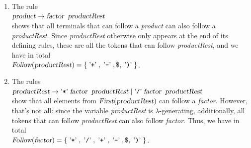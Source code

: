 \begin{enumerate}
      is \(\lambda\)-generating, additionally, all tokens that can follow \textsl{exprRest} can also follow \textsl{product}. Thus, we have in total
      \\[0.2cm]
      \hspace*{1.3cm}
      \(\textsl{Follow}(\textsl{product}) = 
      \{ \aquoted{+}, \aquoted{-}, \$, \aquoted{)} \}\).
\item The rule
      \\[0.2cm]
      \hspace*{1.3cm}
      \(\textsl{product} \rightarrow \textsl{factor}\;\;\textsl{productRest}\)
      \\[0.2cm]      
      shows that all terminals that can follow a \textsl{product} can also follow
      a \textsl{productRest}.
      Since \textsl{productRest} otherwise only appears at the end of its defining rules, these are all the tokens that can follow
      \textsl{productRest}, and we have in total
      \\[0.2cm]
      \hspace*{1.3cm}
      \(\textsl{Follow}(\textsl{productRest}) = \{ \;\mbox{'\texttt{+}'}\;, \;\mbox{'\texttt{-}'}\;, \$, \;\mbox{'\texttt{)}'}\; \}\).
\item The rules 
      \\[0.2cm]
      \hspace*{1.3cm}
      \(\textsl{productRest} \rightarrow \mbox{'\texttt{*}'}\; \textsl{factor}\;\;\textsl{productRest} 
                            \mid        \mbox{'\texttt{/}'}\; \textsl{factor}\;\;\textsl{productRest}\) 
      \\[0.2cm]
      show that all elements from \(\textsl{First}(\textsl{productRest})\)
      can follow a \textsl{factor}. However, that's not all: since the variable \textsl{productRest}
      is \(\lambda\)-generating, additionally, all tokens that can follow \textsl{productRest} can also follow \textsl{factor}. Thus, we have in total
      \\[0.2cm]
      \hspace*{1.3cm}
      \(\textsl{Follow}(\textsl{factor}) = \{ \;\mbox{'\texttt{*}'}\;, \;\mbox{'\texttt{/}'}\;, \;\mbox{'\texttt{+}'}\;, \;\mbox{'\texttt{-}'}\;, \$, \;\mbox{'\texttt{)}'}\; \}\).
      \eox
\end{enumerate}

